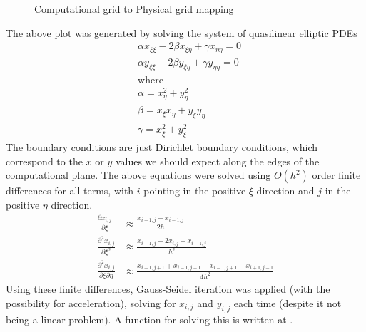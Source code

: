 \documentclass{article}
\numberwithin{equation}{section}
\theoremstyle{definition}
\newcommand{\pp}[2]{\frac{\partial #1}{\partial #2}}
\newcommand{\ppn}[3]{\frac{\partial^{#1} #2}{\partial #3^{#1}}}
\begin{document}
\begin{figure}[H]
    \centering
    \hfill
    \caption{Computational grid to Physical grid mapping}
    \label{fig:fig10}
\end{figure}
The above plot was generated by solving the system of quasilinear elliptic PDEs
\begin{align}
    \label{eq:xypde}
    &\alpha x_{\xi\xi} - 2\beta x_{\xi\eta} + \gamma x_{\eta\eta} = 0 \\
    &\alpha y_{\xi\xi} - 2\beta y_{\xi\eta} + \gamma y_{\eta\eta} = 0 \nonumber\\
    &\text{where} \nonumber\\
    &\alpha = x_{\eta}^2 + y_{\eta}^2 \nonumber\\
    &\beta = x_{\xi} x_{\eta} + y_{\xi} y_{\eta} \nonumber\\
    &\gamma = x_{\xi}^2 + y_{\xi}^2 \nonumber
\end{align}
The boundary conditions are just Dirichlet boundary conditions, which correspond to the $x$ or $y$ values we should expect along the edges of the computational plane. The above equations were solved using $O(h^2)$ order finite differences for all terms, with $i$ pointing in the positive $\xi$ direction and $j$ in the positive $\eta$ direction.
\begin{align}
    \pp{x_{i,j}}{\xi} &\approx \frac{x_{i+1,j} - x_{i-1,j}}{2h} \\
    \ppn{2}{x_{i,j}}{\xi} &\approx \frac{x_{i+1,j} - 2x_{i,j} + x_{i-1,j}}{h^2} \\
    \frac{\partial^2 x_{i,j}}{\partial \xi \partial \eta} &\approx \frac{x_{i+1,j+1} + x_{i-1,j-1} - x_{i-1,j+1} - x_{i+1,j-1}}{4h^2}
\end{align}
Using these finite differences, Gauss-Seidel iteration was applied (with the possibility for acceleration), solving for $x_{i,j}$ and $y_{i,j}$ each time (despite it not being a linear problem). A function for solving this is written at . %
\end{document}
